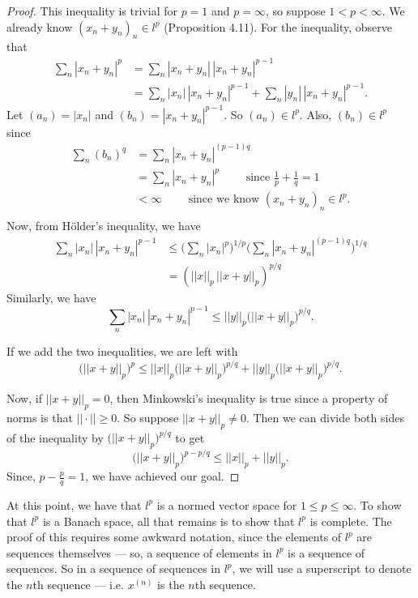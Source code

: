 \begin{proof}
This inequality is trivial for $p=1$ and $p=\infty$, so suppose $1 < p < \infty$.  We already know $(x_n + y_n)_n \in l^p$ (Proposition 4.11).  For the inequality, observe that
\begin{align*}
\sum_n |x_n + y_n|^p &= \sum_n |x_n + y_n|\,|x_n + y_n|^{p-1}\\
&= \sum_n |x_n|\,|x_n + y_n|^{p-1} + \sum_n |y_n|\,|x_n + y_n|^{p-1}.
\end{align*}
Let $(a_n) = |x_n|$ and $(b_n) = |x_n + y_n|^{p-1}$.  So $(a_n) \in l^p$.  Also, $(b_n) \in l^p$ since
\begin{align*}
\sum_n (b_n)^q &= \sum_n |x_n + y_n|^{(p-1)q}\\
&= \sum_n |x_n + y_n|^p \qquad\textrm{ since } \frac{1}{p} + \frac{1}{q} = 1\\
&< \infty \qquad\textrm{ since we know } (x_n + y_n)_n \in l^p.\\
\end{align*}
Now, from H{\"o}lder's inequality, we have
\begin{align*}
\sum_n |x_n|\,|x_n+y_n|^{p-1} &\leq \biggl(\sum_n |x_n|^p\biggr)^{1/p} \biggl(\sum_n |x_n + y_n|^{(p-1)q}\biggr)^{1/q}\\
&= (||x||_p\,||x + y||_p)^{p/q}
\end{align*}
Similarly, we have
\[\sum_n|x_n|\,|x_n + y_n|^{p-1} \leq ||y||_p\bigl(||x+y||_p\bigr)^{p/q}.\]

If we add the two inequalities, we are left with
\[\bigl(||x+y||_p\bigr)^p \leq ||x||_p\bigl(||x + y||_p\bigr)^{p/q} + ||y||_p\bigl(||x+y||_p\bigr)^{p/q}.\]

Now, if $||x+y||_p = 0$, then Minkowski's inequality is true since a property of norms is that $||\cdot|| \geq 0$.  So suppose $||x+y||_p \neq 0$.  Then we can divide both sides of the inequality by $\bigl(||x+y||_p\bigr)^{p/q}$ to get
\[\bigl(||x+y||_p\bigr)^{p-p/q} \leq ||x||_p + ||y||_p.\]
Since, $p-\frac{p}{q} = 1$, we have achieved our goal.
\end{proof}

At this point, we have that $l^p$ is a normed vector space for $1 \leq p \leq \infty$.  To show that $l^p$ is a Banach space, all that remains is to show that $l^p$ is complete.  The proof of this requires some awkward notation, since the elements of $l^p$ are sequences themselves --- so, a sequence of elements in $l^p$ is a sequence of sequences.  So in a sequence of sequences in $l^p$, we will use a superscript to denote the $n$th sequence --- i.e. $x^{(n)}$ is the $n$th sequence.

